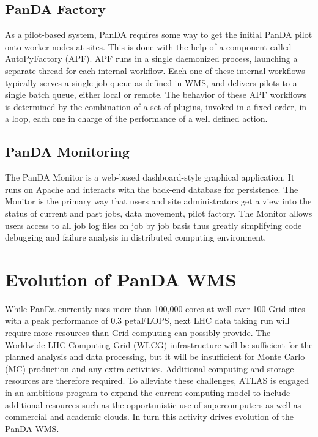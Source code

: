 \documentclass[10pt, conference, compsocconf]{IEEEtran}
\begin{document}
\subsection{PanDA Factory}
As a pilot-based  system, PanDA  requires some way to get the initial PanDA pilot onto worker nodes at sites. This is done with the help of a component  called AutoPyFactory (APF). APF runs in a single daemonized process, launching  a separate thread for each internal  workflow. Each one of these internal workflows typically serves  a single job queue  as defined  in WMS, and delivers pilots to a single batch queue, either local or remote. The behavior of these APF workflows is determined by the combination of a set  of plugins, invoked in a  fixed order, in a loop, each one in charge of the performance of a well defined action.

\subsection{PanDA Monitoring}
The PanDA Monitor is a web-based dashboard-style  graphical application. It runs on Apache and interacts with the back-end database for persistence. The Monitor is the primary way that users and site administrators get a  view into the status of current and past jobs, data movement,  pilot factory. The Monitor allows users  access  to all job log files on job by job basis thus greatly simplifying code debugging and failure analysis in distributed computing environment.

\section{Evolution of PanDA WMS}
While PanDa  currently uses  more than 100,000  cores at well over 100 Grid sites with a  peak performance  of 0.3 petaFLOPS,  next LHC data taking run will  require more resources  than Grid computing can possibly provide. The Worldwide LHC Computing Grid (WLCG) infrastructure will be sufficient for the planned analysis and data processing, but it will be insufficient  for Monte Carlo (MC) production and any extra activities. Additional computing and storage  resources are therefore required.  To alleviate  these challenges, ATLAS is engaged  in an ambitious  program to expand  the current computing model to include  additional  resources such as the opportunistic   use of supercomputers   as well as commercial and academic clouds. In turn this activity drives evolution of the PanDA WMS.
\end{document}

